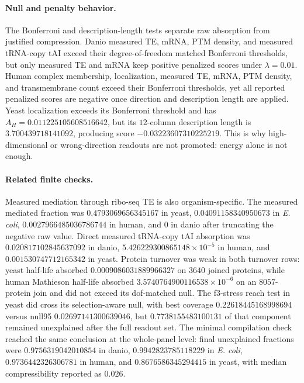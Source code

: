\paragraph{Null and penalty behavior.}
The Bonferroni and description-length tests separate raw absorption from justified compression.  Danio measured TE, mRNA, PTM density, and measured tRNA-copy tAI exceed their degree-of-freedom matched Bonferroni thresholds, but only measured TE and mRNA keep positive penalized scores under $\lambda=0.01$.  Human complex membership, localization, measured TE, mRNA, PTM density, and transmembrane count exceed their Bonferroni thresholds, yet all reported penalized scores are negative once direction and description length are applied.  Yeast localization exceeds its Bonferroni threshold and has $A_H=0.011225105608516642$, but its $12$-column description length is $3.700439718141092$, producing score $-0.03223607310225219$.  This is why high-dimensional or wrong-direction readouts are not promoted: energy alone is not enough.

\paragraph{Related finite checks.}
Measured mediation through ribo-seq TE is also organism-specific.  The measured mediated fraction was $0.4793069656345167$ in yeast, $0.04091158340950673$ in \textit{E. coli}, $0.0027966485036786744$ in human, and $0$ in danio after truncating the negative raw value.  Direct measured tRNA-copy tAI absorption was $0.020817102845637092$ in danio, $5.426229300865148\times 10^{-5}$ in human, and $0.001530747712165342$ in yeast.  Protein turnover was weak in both turnover rows: yeast half-life absorbed $0.0009086031889966327$ on $3640$ joined proteins, while human Mathieson half-life absorbed $3.5740764900116538\times 10^{-6}$ on an $8057$-protein join and did not exceed its dof-matched null.  The f3-stress reach test in yeast did cross its selection-aware null, with best coverage $0.22618445168998694$ versus null95 $0.02697141300639046$, but $0.7738155483100131$ of that component remained unexplained after the full readout set.  The minimal compilation check reached the same conclusion at the whole-panel level: final unexplained fractions were $0.9756319042010854$ in danio, $0.9942823785118229$ in \textit{E. coli}, $0.9736442326306781$ in human, and $0.8676586345294415$ in yeast, with median compressibility reported as $0.026$.

